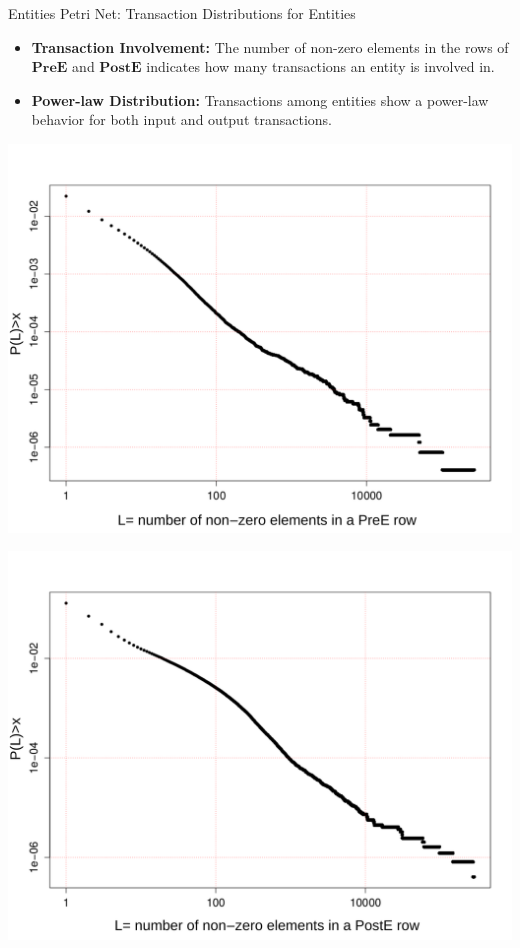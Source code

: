 \documentclass{beamer}
\begin{document}
\begin{frame}{Entities Petri Net: Transaction Distributions for Entities}
    \footnotesize
    \begin{itemize}
        \item \textbf{Transaction Involvement:} The number of non-zero elements in the rows of $\mathbf{PreE}$ and $\mathbf{PostE}$ indicates how many transactions an entity is involved in.
        \item \textbf{Power-law Distribution:} Transactions among entities show a power-law behavior for both input and output transactions.
    \end{itemize}
    \vspace{0.3cm}
    \begin{minipage}[c]{0.45\textwidth}
        \centering
        \includegraphics[width=0.95\linewidth]{PreE}
        \label{fig_preE_CCDF}
    \end{minipage}
    \hspace{0.5cm}
    \begin{minipage}[c]{0.45\textwidth}
        \centering
        \includegraphics[width=0.95\linewidth]{PostE}
        \label{fig_postE_CCDF}
    \end{minipage}
\end{frame}
\end{document}
